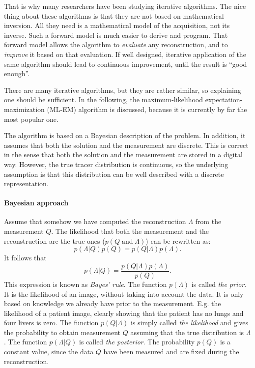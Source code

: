 \documentclass[11pt,oneside]{article}
\begin{document}
That is why many researchers have been studying iterative algorithms. The nice
thing about these algorithms is that they are not based on mathematical
inversion.  All they need is a mathematical model of the acquisition, not its
inverse. Such a forward model is much easier to derive and program. That
forward model allows the algorithm to {\em evaluate} any reconstruction, and
to {\em improve} it based on that evaluation. If well designed, iterative
application of the same algorithm should lead to continuous improvement, until
the result is ``good enough''.

There are many iterative algorithms, but they are rather similar, so
explaining one should be sufficient. In the following, the maximum-likelihood
expectation-maximization (ML-EM) algorithm is discussed, because it is
currently by far the most popular one.

The algorithm is based on a Bayesian description of the problem. In
addition, it assumes that both the solution and the measurement are
discrete. This is correct in the sense that both the solution and the
measurement are stored in a digital way. However, the true tracer
distribution is continuous, so the underlying assumption is that this
distribution can be well described with a discrete representation.

\paragraph{Bayesian approach} \label{sec:bayes}
Assume that somehow we have computed the reconstruction $\Lambda$ from the
measurement $Q$. The likelihood that both the measurement and the
reconstruction are the true ones ($p(Q \; \mbox{and} \; \Lambda)$) can be
rewritten as:
\begin{equation}
  p(\Lambda | Q) p(Q) = p(Q | \Lambda) p(\Lambda).
\end{equation}
It follows that
\begin{equation}
   p(\Lambda | Q) = \frac{p(Q | \Lambda) p(\Lambda)}{p(Q)}. \label{eq:jnpost}
\end{equation}
This expression is known as {\em Bayes' rule}. The function
$p(\Lambda)$ is called {\em the prior}. It is the likelihood of an
image, without taking into account the data. It is only based on
knowledge we already have prior to the measurement. E.g. the
likelihood of a patient image, clearly showing that the patient has no
lungs and four livers is zero. The function $p(Q | \Lambda)$ is simply
called {\em the likelihood} and gives the probability to obtain
measurement $Q$ assuming that the true distribution is $\Lambda$. The
function $p(\Lambda | Q)$ is called {\em the posterior}. The
probability $p(Q)$ is a constant value, since the data $Q$ have been
measured and are fixed during the reconstruction.
\end{document}
